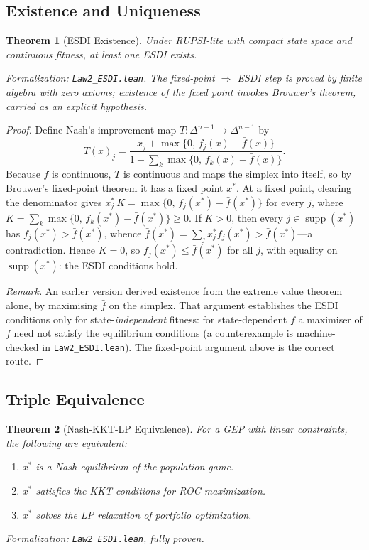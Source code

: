\documentclass[12pt]{article}
\newtheorem{theorem}{Theorem}[section]
\begin{document}
\subsection{Existence and Uniqueness}

\begin{theorem}[ESDI Existence]
\label{thm:esdi-existence}
Under RUPSI-lite with compact state space and continuous fitness, at least one ESDI exists.
\end{theorem}
\noindent\textit{Formalization: \texttt{Law2\_ESDI.lean}. The fixed-point $\Rightarrow$ ESDI step is proved by finite algebra with zero axioms; existence of the fixed point invokes Brouwer's theorem, carried as an explicit hypothesis.}

\begin{proof}
Define Nash's improvement map $T : \Delta^{n-1} \to \Delta^{n-1}$ by
\[
T(x)_j = \frac{x_j + \max\{0,\, f_j(x) - \bar{f}(x)\}}{1 + \sum_k \max\{0,\, f_k(x) - \bar{f}(x)\}}.
\]
Because $f$ is continuous, $T$ is continuous and maps the simplex into itself, so by Brouwer's fixed-point theorem it has a fixed point $x^*$. At a fixed point, clearing the denominator gives $x^*_j\, K = \max\{0,\, f_j(x^*) - \bar{f}(x^*)\}$ for every $j$, where $K = \sum_k \max\{0,\, f_k(x^*) - \bar{f}(x^*)\} \geq 0$. If $K > 0$, then every $j \in \operatorname{supp}(x^*)$ has $f_j(x^*) > \bar{f}(x^*)$, whence $\bar{f}(x^*) = \sum_j x^*_j f_j(x^*) > \bar{f}(x^*)$---a contradiction. Hence $K = 0$, so $f_j(x^*) \leq \bar{f}(x^*)$ for all $j$, with equality on $\operatorname{supp}(x^*)$: the ESDI conditions hold.

\emph{Remark.} An earlier version derived existence from the extreme value theorem alone, by maximising $\bar{f}$ on the simplex. That argument establishes the ESDI conditions only for state-\emph{independent} fitness: for state-dependent $f$ a maximiser of $\bar{f}$ need not satisfy the equilibrium conditions (a counterexample is machine-checked in \texttt{Law2\_ESDI.lean}). The fixed-point argument above is the correct route.
\end{proof}

\subsection{Triple Equivalence}

\begin{theorem}[Nash-KKT-LP Equivalence]
\label{thm:triple-equivalence}
For a GEP with linear constraints, the following are equivalent:
\begin{enumerate}
    \item $x^*$ is a Nash equilibrium of the population game.
    \item $x^*$ satisfies the KKT conditions for ROC maximization.
    \item $x^*$ solves the LP relaxation of portfolio optimization.
\end{enumerate}
\end{theorem}
\noindent\textit{Formalization: \texttt{Law2\_ESDI.lean}, fully proven.}
\end{document}
